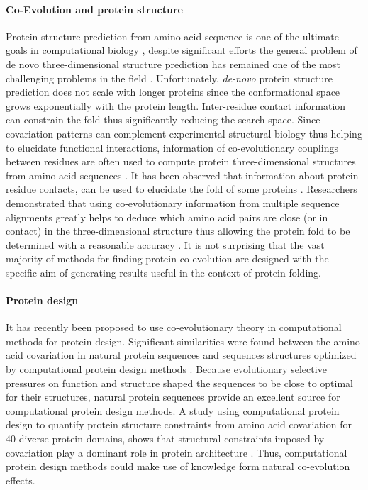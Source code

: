 \paragraph{Co-Evolution and protein structure}
Protein structure prediction from amino acid sequence is one of the ultimate goals in computational biology \cite{burger2010disentangling}, despite significant efforts the general problem of de novo three-dimensional structure prediction has remained one of the most challenging problems in the field \cite{marks2012protein}.
Unfortunately, \textit{de-novo} protein structure prediction does not scale with longer proteins since the conformational space grows exponentially with the protein length.
Inter-residue contact information can constrain the fold thus significantly reducing the search space.
Since covariation patterns can complement experimental structural biology thus helping to elucidate functional interactions, information of co-evolutionary couplings between residues are often used to compute protein three-dimensional structures from amino acid sequences \cite{marks2012protein}.
It has been observed that information about protein residue contacts, can be used to elucidate the fold of some proteins \cite{jones2012psicov}.
Researchers demonstrated that using co-evolutionary information from multiple sequence alignments greatly helps to deduce which amino acid pairs are close (or in contact) in the three-dimensional structure thus allowing the protein fold to be determined with a reasonable accuracy \cite{marks2012protein}.
It is not surprising that the vast majority of methods for finding protein co-evolution are designed with the specific aim of generating results useful in the context of protein folding.

\paragraph{Protein design}
It has recently been proposed to use co-evolutionary theory in computational methods for protein design.
Significant similarities were found between the amino acid covariation in natural protein sequences and sequences structures optimized by computational protein design methods \cite{ollikainen2013computational}.
Because evolutionary selective pressures on function and structure shaped the sequences to be close to optimal for their structures, natural protein sequences provide an excellent source for computational protein design methods.
A study using computational protein design to quantify protein structure constraints from amino acid covariation for 40 diverse protein domains, shows that structural constraints imposed by covariation play a dominant role in protein architecture \cite{ollikainen2013computational}.
Thus, computational protein design methods could make use of knowledge form natural co-evolution effects.

